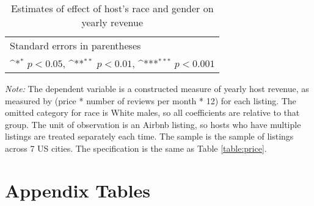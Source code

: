 \begin{table}[htbp]\centering
	\def\sym#1{\ifmmode^{#1}\else\(^{#1}\)\fi}
	\caption{Estimates of effect of host's race and gender on yearly revenue}
	\begin{tabular}{l*{4}{c}}
		\hline\hline
		
		\hline\hline
		\multicolumn{5}{l}{\footnotesize Standard errors in parentheses}\\
		\multicolumn{5}{l}{\footnotesize \sym{*} \(p<0.05\), \sym{**} \(p<0.01\), \sym{***} \(p<0.001\)}\\
	\end{tabular}
\label{revenue}
	\begin{tablenotes}
		\item {\it Note:} The dependent variable is a constructed measure of yearly host revenue, as measured by (price * number of reviews per month * 12) for each listing. The omitted category for race is White males, so all coefficients are relative to that group. The unit of observation is an Airbnb listing, so hosts who have multiple listings are treated separately each time. The sample is the sample of listings across 7 US cities. The specification is the same as Table \ref{table:price}.
	\end{tablenotes}
\end{table}


\newpage

\section{Appendix Tables}

